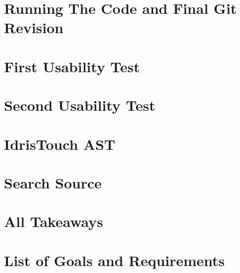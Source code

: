 \appendix
\label{Appendix}
\chapter{Running The Code and Final Git Revision}

\chapter{First Usability Test}
\label{chap:FirstUsabilityTest}


\chapter{Second Usability Test}
\label{chap:SecondUsabilityTest}


\chapter{IdrisTouch AST}
\label{chap:IdrisTouch_AST}



\chapter{Search Source}
\label{chap:SearchSource}

\chapter{All Takeaways}
\label{chap:AllTakeaways}


\chapter{List of Goals and Requirements}
\label{chap:ListOfAllGoalsAndRequirements}
